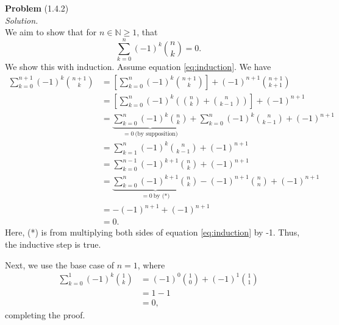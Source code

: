 \documentclass[12 pt]{amsart}
\begin{document}
\phantom{\quad} \vfill
\noindent
\textbf{Problem} (1.4.2) \\[4ex]
\emph{Solution.} \\[2ex]
  We aim to show that for $n \in \mathbb{N} \geq 1$, that
  \begin{equation}
    \label{eq:induction}
    \sum_{k = 0}^n (-1)^k \binom{n}{k} = 0.
  \end{equation}
  We show this with induction.
  Assume equation \ref{eq:induction}.
  We have
  \begin{align*}
    \sum_{k = 0}^{n+1} (-1)^k \binom{n+1}{k}
    &=
      \left[ \sum_{k = 0}^{n} (-1)^k \binom{n+1}{k} \right]
      + (-1)^{n+1} \binom{n+1}{ k+1} \\
    &=
      \left[ \sum_{k = 0}^{n} (-1)^k \left( \binom{n}{k} + \binom{n}{k-1} \right) \right]
      + (-1)^{n+1} \\
    &=
      \underbrace{\sum_{k = 0}^{n} (-1)^k \binom{n}{k}}_{= 0 \ \text{(by supposition)}}
      +
      \sum_{k = 0}^{n} (-1)^k \binom{n}{k-1}
      + (-1)^{n+1} \\
    &=
      \sum_{k = 1}^{n} (-1)^k \binom{n}{k-1}
      + (-1)^{n+1} \\
    &=
      \sum_{k = 0}^{n-1} (-1)^{k+1} \binom{n}{k}
      + (-1)^{n+1} \\
    &=
      \underbrace{\sum_{k = 0}^{n} (-1)^{k+1} \binom{n}{k}}_{= 0 \ \text{by (*)}}
      - (-1)^{n+1} \binom{n}{n}
      + (-1)^{n+1} \\
    &=
      - (-1)^{n+1} 
      + (-1)^{n+1} \\
    &=
      0.
  \end{align*}
  Here, (*) is from multiplying both sides of equation \ref{eq:induction} by -1. 
  Thus, the inductive step is true.

  Next, we use the base case of $n = 1$, where
  \begin{align*}
    \sum_{k = 0}^1 (-1)^k \binom{1}{k}
    &= 
      (-1)^0 \binom{1}{0}
      + 
      (-1)^1 \binom{1}{1} \\
    &=
      1 - 1 \\
    &= 
      0,
  \end{align*}
  completing the proof.
\vfill
\newpage
\end{document}
